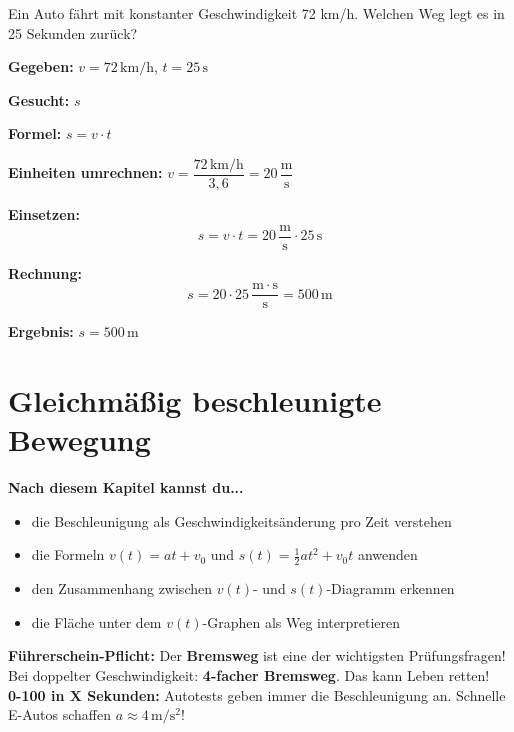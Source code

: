 \documentclass[11pt,a4paper]{article}
\begin{document}
\begin{beispiel}
Ein Auto fährt mit konstanter Geschwindigkeit 72 km/h. Welchen Weg legt es in 25 Sekunden zurück?

\textbf{Gegeben:} $v = 72\,\mathrm{km/h}$, \quad $t = 25\,\mathrm{s}$

\textbf{Gesucht:} $s$

\textbf{Formel:} $s = v \cdot t$

\textbf{Einheiten umrechnen:} $v = \dfrac{72\,\mathrm{km/h}}{3{,}6} = 20\,\dfrac{\mathrm{m}}{\mathrm{s}}$

\textbf{Einsetzen:}
\[
s = v \cdot t = 20\,\frac{\mathrm{m}}{\mathrm{s}} \cdot 25\,\mathrm{s}
\]

\textbf{Rechnung:}
\[
s = 20 \cdot 25\,\frac{\mathrm{m} \cdot \mathrm{s}}{\mathrm{s}} = 500\,\mathrm{m}
\]

\textbf{Ergebnis:} $\boxed{s = 500\,\mathrm{m}}$
\end{beispiel}

\newpage
\section{Gleichmäßig beschleunigte Bewegung}

\begin{tcolorbox}[colback=merkegreen!5, colframe=merkegreen, boxrule=0.5pt]
\textbf{Nach diesem Kapitel kannst du...}
\begin{itemize}[itemsep=1pt]
\item[$\checkmark$] die Beschleunigung als Geschwindigkeitsänderung pro Zeit verstehen
\item[$\checkmark$] die Formeln $v(t) = at + v_0$ und $s(t) = \frac{1}{2}at^2 + v_0 t$ anwenden
\item[$\checkmark$] den Zusammenhang zwischen $v(t)$- und $s(t)$-Diagramm erkennen
\item[$\checkmark$] die Fläche unter dem $v(t)$-Graphen als Weg interpretieren
\end{itemize}
\end{tcolorbox}

\begin{alltag}
\textbf{Führerschein-Pflicht:} Der \textbf{Bremsweg} ist eine der wichtigsten Prüfungsfragen! \\[0.3em]
Bei doppelter Geschwindigkeit: \textbf{4-facher Bremsweg}. Das kann Leben retten!\\[0.3em]
\textbf{0-100 in X Sekunden:} Autotests geben immer die Beschleunigung an. Schnelle E-Autos schaffen $a \approx 4\,\mathrm{m/s^2}$!
\end{alltag}
\end{document}
